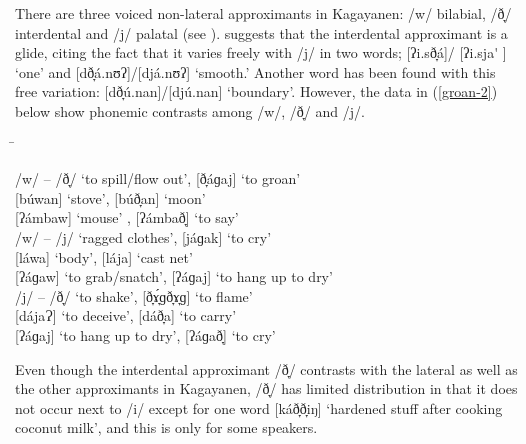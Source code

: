 
There are three voiced non-lateral approximants in Kagayanen: /w/ bilabial, /ð̞/ interdental and /j/ palatal (see ). \citet[27]{harmon1977} suggests that the interdental approximant is a glide, citing the fact that it varies freely with /j/ in two words; [ʔi.sð̞á]/ [ʔi.sja\'{} ] ‘one’ and [dð̞á.nʊʔ]/[djá.nʊʔ] ‘smooth.’ Another word has been found with this free variation: [dð̞ú.nan]/\linebreak{}[djú.nan] ‘boundary’. However, the data in (\ref{groan-2}) below show phonemic contrasts among /w/, /ð̞/ and /j/.

\ea
\label{groan-2}
\begin{tabbing}
\hspace{1.3cm} \= \kill

/w/ – /ð̞/ \> [wáɡaj] ‘to spill/flow out’, [ð̞áɡaj] ‘to groan’ \\
\> {}[búwan] ‘stove’, [búð̞an] ‘moon’ \\
\> {}[ʔámbaw] ‘mouse’ , [ʔámbað̞] ‘to say’ \\
/w/ – /j/ \> [wáɡak] ‘ragged clothes’, [jáɡak] ‘to cry’ \\
\>{}[láwa] ‘body’, [lája] ‘cast net’ \\
\> {}[ʔáɡaw] ‘to grab/snatch’, [ʔáɡaj] ‘to hang up to dry’ \\
/j/ – /ð̞/ \> [jɤ̞́ɡjɤ̞ɡ] ‘to shake’, [ð̞ɤ̞́ɡð̞ɤ̞ɡ] ‘to flame’ \\
\> {}[dájaɁ] ‘to deceive’, [dáð̞a] ‘to carry’ \\
\> {}[ʔáɡaj] ‘to hang up to dry’, [ʔáɡað̞] ‘to cry’
\end{tabbing}
\z

Even though the interdental approximant /ð̞/ contrasts with the lateral as well as the other approximants in Kagayanen, /ð̞/ has limited distribution in that it does not occur next to /i/ except for one word [káð̞ð̞iŋ] ‘hardened stuff after cooking coconut milk’, and this is only for some speakers.

